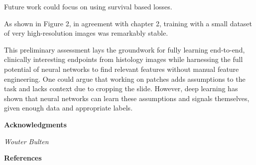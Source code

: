\documentclass[
  12pt,
  a5,margin=2cmpaper,
]{article}
\begin{document}
Future work could focus on using survival based losses.

As shown in Figure 2, in agreement with chapter 2, training with a small
dataset of very high-resolution images was remarkably stable.

This preliminary assessment lays the groundwork for fully learning
end-to-end, clinically interesting endpoints from histology images while
harnessing the full potential of neural networks to find relevant
features without manual feature engineering. One could argue that
working on patches adds assumptions to the task and lacks context due to
cropping the slide. However, deep learning has shown that neural
networks can learn these assumptions and signals themselves, given
enough data and appropriate labels.

\textbf{Acknowledgments}

\emph{Wouter Bulten}

\textbf{References}
\end{document}
